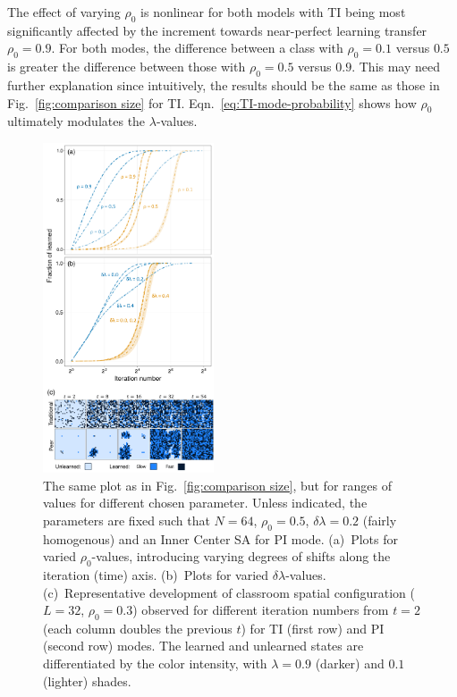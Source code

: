 \documentclass[twocolumn,secnumarabic,amssymb, nobibnotes, aps, prd]{revtex4-2}
\begin{document}
        The effect of varying $\rho_0$ is nonlinear for both models with TI being most significantly affected by the increment towards near-perfect learning transfer $\rho_0={0.9}$.
        For both modes, the difference between a class with $\rho_0=0.1$ versus $0.5$ is greater the difference between those with $\rho_0=0.5$ {versus} $0.9$.
        {\color{red}
        This may need further explanation since intuitively, the results should be the same as those in Fig.~\ref{fig:comparison size} for TI.
        Eqn.~\ref{eq:TI-mode-probability} shows how $\rho_0$ ultimately modulates the $\lambda$-values.
        }
        \begin{figure}[htbp]
        \centering
        \includegraphics[width=0.45\textwidth]{figures/figure4.png}
        \caption{
        The same plot as in Fig.~\ref{fig:comparison size}, but for ranges of values for different chosen parameter.
        Unless indicated, the parameters are fixed such that $N=64$, $\rho_0=0.5$, $\delta\lambda=0.2$ (fairly homogenous) and an Inner Center SA for PI mode.
        (a)~Plots for varied $\rho_0$-values, introducing varying degrees of shifts along the iteration (time) axis.
        (b)~Plots for varied $\delta\lambda$-values.
        (c)~Representative development of classroom spatial configuration ($L=32$, $\rho_0=0.3$) observed for different iteration numbers from $t=2$ (each column doubles the previous $t$) for TI (first row) and PI (second row) modes.
        The learned and unlearned states are differentiated by the color intensity, with $\lambda=0.9$ (darker) and $0.1$ (lighter) shades.
        }
        \label{fig:comparison rates}
        \end{figure}
\end{document}
